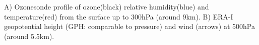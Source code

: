 \label{fig:MelbStormSonde}
A) Ozonesonde profile of ozone(black) relative humidity(blue) and temperature(red) from the surface up to 300hPa (around 9km).
B) ERA-I geopotential height (GPH: comparable to pressure) and wind (arrows) at 500hPa (around 5.5km).